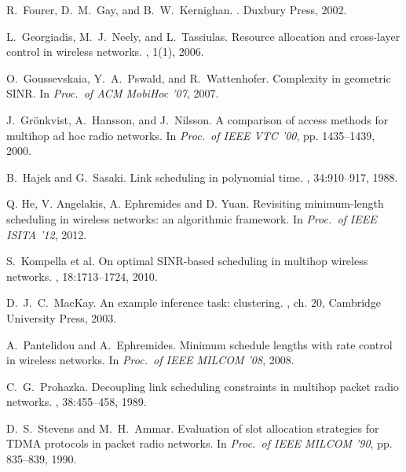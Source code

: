 \documentclass[10pt,onecolumn,journal,draftcls,oneside]{IEEEtran}
\newcounter{exam}
\begin{document}
\begin{thebibliography}{1}
R.~Fourer, D.~M.~Gay, and B.~W.~Kernighan.
. Duxbury Press, 2002.

L.~Georgiadis, M.~J.~Neely, and L.~Tassiulas.
\newblock Resource allocation and cross-layer control in wireless networks.
, 1(1), 2006.

O.~Goussevskaia, Y.~A.~Pswald, and R.~Wattenhofer.
\newblock Complexity in geometric SINR.
\newblock In {\em Proc.\ of ACM MobiHoc '07}, 2007.

J.~Gr{\"o}nkvist, A.~Hansson, and J.~Nilsson.
\newblock A comparison of access methods for multihop ad hoc radio networks.
\newblock In {\em Proc.\ of IEEE VTC '00}, pp. 1435--1439, 2000.

B.~Hajek and G.~Sasaki.
\newblock Link scheduling in polynomial time.
, 34:910--917, 1988.

Q. He, V. Angelakis, A. Ephremides and D. Yuan.
\newblock Revisiting minimum-length scheduling in wireless networks: an algorithmic framework.
\newblock In {\em Proc.\ of IEEE ISITA '12}, 2012.

S.~Kompella et al.
\newblock On optimal SINR-based scheduling in multihop wireless networks.
, 18:1713--1724, 2010.

D.~J.~C.~MacKay.
\newblock An example inference task: clustering.
, ch. 20, Cambridge University Press, 2003.

A.~Pantelidou and A.~Ephremides.
\newblock Minimum schedule lengths with rate control in wireless networks.
\newblock In {\em Proc.\ of IEEE MILCOM '08}, 2008.

C.~G.~Prohazka.
\newblock Decoupling link scheduling constraints in multihop packet radio
networks.
, 38:455--458, 1989.

D.~S.~Stevens and M.~H.~Ammar.
\newblock Evaluation of slot allocation strategies for TDMA protocols
in packet radio networks.
\newblock In {\em Proc.\ of IEEE MILCOM '90}, pp. 835--839, 1990.





















\end{thebibliography}

\appendices
\end{document}
